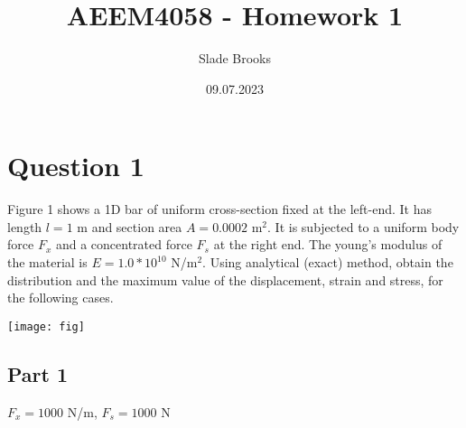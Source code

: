 \documentclass{article}
\title{AEEM4058 - Homework 1}
\author{Slade Brooks}
\date{09.07.2023}
\begin{document}
\maketitle


\section*{Question 1}
Figure 1 shows a 1D bar of uniform cross-section fixed at the
left-end. It has length $l=1$ m and section area $A=0.0002$ m$^2$.
It is subjected to a uniform body force $F_x$ and a concentrated 
force $F_s$ at the right end. The young’s modulus of the material
is $E=1.0*10^{10}$ N/m$^2$. Using analytical (exact) method,
obtain the distribution and the maximum value of the displacement,
strain and stress, for the following cases.

\begin{center}
    \texttt{[image: fig]}  
\end{center}

\subsection*{Part 1}
$F_x = 1000$ N/m, $F_s = 1000$ N
\end{document}
